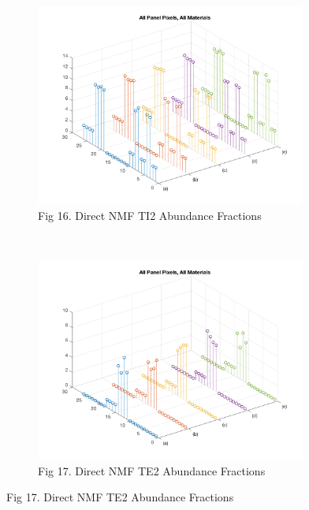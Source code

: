 \documentclass[journal]{IEEEtran}
\begin{document}
\begin{figure}[!t]
    \begin{subfigure}[b]{0.5\textwidth}
    \centering
    \includegraphics[width=3.5in]{direct_ti2_nmf_allmaterials.png}
    \caption{Fig 16. Direct NMF TI2 Abundance Fractions}
    \label{fig:direct_nmf_ti2_abundance}
    \end{subfigure}
~
    \begin{subfigure}[b]{0.5\textwidth}
    \centering
    \includegraphics[width=3.5in]{direct_te2_nmf_allmaterials.png}
    \caption{Fig 17. Direct NMF TE2 Abundance Fractions}
    \label{fig:direct_nmf_te2_abundance}
    \end{subfigure}
\end{figure}
\end{document}
